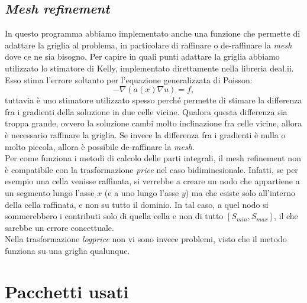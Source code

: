 \documentclass[a4paper,10pt]{report}
\theoremstyle{plain}
\theoremstyle{definition}
\theoremstyle{remark}
\begin{document}
\section{\emph{Mesh refinement}}
In questo programma abbiamo implementato anche una funzione che permette di adattare la griglia al problema, in particolare di raffinare o de-raffinare la \emph{mesh} dove ce ne sia bisogno. Per capire in quali punti adattare la griglia abbiamo utilizzato lo stimatore di Kelly, implementato direttamente nella libreria \textsf{deal.ii}. Esso stima l'errore soltanto per l'equazione generalizzata di Poisson: $$-\nabla\left(a(x)\nabla u\right)=f,$$tuttavia \`e uno stimatore utilizzato spesso perch\'e permette di stimare la differenza fra i gradienti della soluzione in due celle vicine. Qualora questa differenza sia troppa grande, ovvero la soluzione cambi molto inclinazione fra celle vicine, allora \`e necessario raffinare la griglia. Se invece la differenza fra i gradienti \`e nulla o molto piccola, allora \`e possibile de-raffinare la \emph{mesh}.\\
Per come funziona i metodi di calcolo delle parti integrali, il mesh refinement non è compatibile con la trasformazione \emph{price} nel caso bidiminesionale. Infatti, se per esempio una cella venisse raffinata, si verrebbe a creare un nodo che appartiene a un segmento lungo l'asse $x$ (e a uno lungo l'asse $y$) ma che esiste solo all'interno della cella raffinata, e non su tutto il dominio. In tal caso, a quel nodo si sommerebbero i contributi solo di quella cella e non di tutto $[S_{min},S_{max}]$, il che sarebbe un errore concettuale.\\
Nella trasformazione \emph{logprice} non vi sono invece problemi, visto che il metodo funziona su una griglia qualunque.

\chapter{Pacchetti usati}
\end{document}
